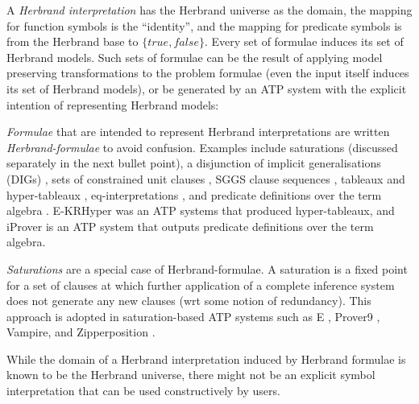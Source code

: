 \documentclass{easychair}
\newenvironment{packed_itemize}{
\vspace*{-0.3em}
\begin{itemize}
\setlength{\partopsep}{0pt}
\setlength{\itemsep}{1pt}
\setlength{\parskip}{0pt}
\setlength{\parsep}{0pt}
}{\end{itemize}}
\begin{document}
\vspace*{0.8em}
A \emph{Herbrand interpretation} \cite{Her30} has the Herbrand universe as the domain, the mapping 
for function symbols is the ``identity'', and the mapping for predicate symbols is from the 
Herbrand base to $\{true,false\}$.
Every set of formulae induces its set of Herbrand models.
Such sets of formulae can be the result of applying model preserving transformations to the 
problem formulae (even the input itself induces its set of Herbrand models), or be generated 
by an ATP system with the explicit intention of representing Herbrand models:
\begin{packed_itemize}
\item \emph{Formulae} that are intended to represent Herbrand interpretations are written 
      \emph{Herbrand-formulae} to avoid confusion.
      Examples include saturations (discussed separately in the next bullet point), a disjunction 
      of implicit generalisations (DIGs) \cite{LM87}, sets of constrained unit clauses 
      \cite{CZ92,CP95,CP95-TAB}, SGGS clause sequences \cite{BP16}, tableaux \cite{Hah01}
      and hyper-tableaux \cite{BFN96}, eq-interpretations \cite{Pel03-EQMC}, and 
      predicate definitions over the term algebra \cite{SK12}.
      E-KRHyper \cite{PW07} was an ATP systems that produced hyper-tableaux, and
      iProver \cite{Kor08,SK12} is an ATP system that outputs predicate definitions 
      over the term algebra.
\item \emph{Saturations} \cite{BG+01,Pel03-JSC} are a special case of Herbrand-formulae.
      A saturation is a fixed point for a set of clauses at which further application of a
      complete inference system does not generate any new clauses (wrt some notion of redundancy).
      This approach is adopted in saturation-based ATP systems such as E \cite{SCV19},
      Prover9 \cite{McC-Prover9-URL}, Vampire, and Zipperposition \cite{VB+21}.
\end{packed_itemize}
While the domain of a Herbrand interpretation induced by Herbrand formulae is known to be the 
Herbrand universe, there might not be an explicit symbol interpretation that can be used 
constructively by users.
\end{document}

